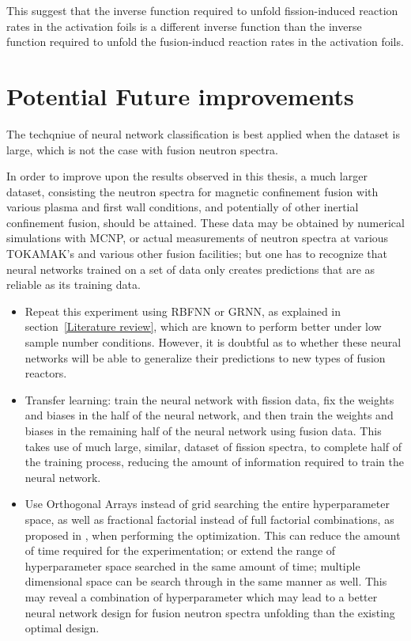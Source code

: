 \documentclass[a4paper, 12pt]{article}
\begin{document}
This suggest that the inverse function required to unfold fission-induced reaction rates in the activation foils is a different inverse function than the inverse function required to unfold the fusion-inducd reaction rates in the activation foils.%

\section{Potential Future improvements}
The techqniue of neural network classification is best applied when the dataset is large, which is not the case with fusion neutron spectra.

In order to improve upon the results observed in this thesis, a much larger dataset, consisting the neutron spectra for magnetic confinement fusion with various plasma and first wall conditions, and potentially of other inertial confinement fusion, should be attained. These data may be obtained by numerical simulations with MCNP, or actual measurements of neutron spectra at various TOKAMAK's and various other fusion facilities; but one has to recognize that neural networks trained on a set of data only creates predictions that are as reliable as its training data.%

\begin{itemize}
    \item Repeat this experiment using RBFNN or GRNN, as explained in section~\ref{Literature review}, which are known to perform better under low sample number conditions. However, it is doubtful as to whether these neural networks will be able to generalize their predictions to new types of fusion reactors.
    \item Transfer learning\cite{TransferLearning}: train the neural network with fission data, fix the weights and biases in the half of the neural network, and then train the weights and biases in the remaining half of the neural network using fusion data. This takes use of much large, similar, dataset of fission spectra, to complete half of the training process, reducing the amount of information required to train the neural network.
    \item Use Orthogonal Arrays instead of grid searching the entire hyperparameter space, as well as fractional factorial instead of full factorial combinations, as proposed in \cite{RDANNM}, when performing the optimization. This can reduce the amount of time required for the experimentation; or extend the range of hyperparameter space searched in the same amount of time; multiple dimensional space can be search through in the same manner as well. This may reveal a combination of hyperparameter which may lead to a better neural network design for fusion neutron spectra unfolding than the existing optimal design.
\end{itemize}
\end{document}
